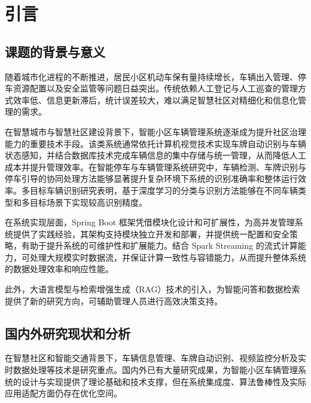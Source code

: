 \documentclass{wzuthesis} %
\begin{document}
\frontmatter
{}
\makeUndergraduateCover    %

\makedisclaim %

\maketableofcontents        %

\makeabstract       %
\mainmatter

\chapter{引言}

\section{课题的背景与意义}

随着城市化进程的不断推进，居民小区机动车保有量持续增长，车辆出入管理、停车资源配置以及安全监管等问题日益突出。传统依赖人工登记与人工巡查的管理方式效率低、信息更新滞后，统计误差较大，难以满足智慧社区对精细化和信息化管理的需求。

在智慧城市与智慧社区建设背景下，智能小区车辆管理系统逐渐成为提升社区治理能力的重要技术手段。该类系统通常依托计算机视觉技术实现车牌自动识别与车辆状态感知，并结合数据库技术完成车辆信息的集中存储与统一管理，从而降低人工成本并提升管理效率。在智能停车与车辆管理系统研究中，车辆检测、车牌识别与停车引导的协同处理方法能够显著提升复杂环境下系统的识别准确率和整体运行效率。多目标车辆识别研究表明，基于深度学习的分类与识别方法能够在不同车辆类型和多目标场景下实现较高识别精度。

在系统实现层面，Spring Boot 框架凭借模块化设计和可扩展性，为高并发管理系统提供了实践经验，其架构支持模块独立开发和部署，并提供统一配置和安全策略，有助于提升系统的可维护性和扩展能力。结合 Spark Streaming 的流式计算能力，可处理大规模实时数据流，并保证计算一致性与容错能力，从而提升整体系统的数据处理效率和响应性能。

此外，大语言模型与检索增强生成（RAG）技术的引入，为智能问答和数据检索提供了新的研究方向，可辅助管理人员进行高效决策支持。

\section{国内外研究现状和分析}

在智慧社区和智能交通背景下，车辆信息管理、车牌自动识别、视频监控分析及实时数据处理等技术是研究重点。国内外已有大量研究成果，为智能小区车辆管理系统的设计与实现提供了理论基础和技术支撑，但在系统集成度、算法鲁棒性及实际应用适配方面仍存在优化空间。
\end{document}
